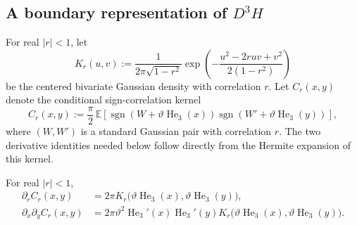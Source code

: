 \subsection{A boundary representation of $D^3H$}
\label{app:certification-boundary-representation}

For real $|r|<1$, let
\[
  K_r(u,v)
  :=\frac{1}{2\pi\sqrt{1-r^2}}
  \exp\!\left(-\frac{u^2-2ruv+v^2}{2(1-r^2)}\right)
\]
be the centered bivariate Gaussian density with correlation $r$.  Let
$C_r(x,y)$ denote the conditional sign-correlation kernel
\[
  C_r(x,y)
  :=\frac{\pi}{2}\,
  \mathbb E\!\left[
  \operatorname{sgn}(W+\vartheta\operatorname{He}_3(x))
  \operatorname{sgn}(W'+\vartheta\operatorname{He}_3(y))
  \right],
\]
where $(W,W')$ is a standard Gaussian pair with correlation $r$.
The two derivative identities needed below follow directly from the Hermite
expansion of this kernel.

\begin{lemma}
\label{lem:appendix-kernel-differentiation}
For real $|r|<1$,
\begin{align}
  \partial_rC_r(x,y)
  &=2\pi K_r\bigl(\vartheta\operatorname{He}_3(x),
                   \vartheta\operatorname{He}_3(y)\bigr),
  \label{eq:appendix-kernel-r}\\
  \partial_x\partial_yC_r(x,y)
  &=2\pi\vartheta^2\operatorname{He}_3'(x)
  \operatorname{He}_3'(y)
  K_r\bigl(\vartheta\operatorname{He}_3(x),
           \vartheta\operatorname{He}_3(y)\bigr).
  \label{eq:appendix-kernel-xy}
\end{align}
\end{lemma}

